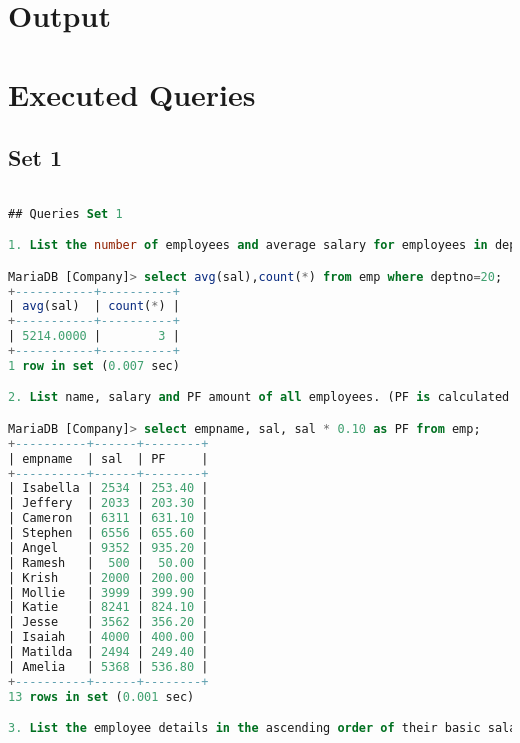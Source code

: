 \documentclass[11pt]{article}
\begin{document}
\section{Output}


\section{Executed Queries}

\subsection{Set 1}
\begin{lstlisting}[language=SQL]

## Queries Set 1

1. List the number of employees and average salary for employees in department 20.

MariaDB [Company]> select avg(sal),count(*) from emp where deptno=20;
+-----------+----------+
| avg(sal)  | count(*) |
+-----------+----------+
| 5214.0000 |        3 |
+-----------+----------+
1 row in set (0.007 sec)

2. List name, salary and PF amount of all employees. (PF is calculated as 10% of basic salary)

MariaDB [Company]> select empname, sal, sal * 0.10 as PF from emp;
+----------+------+--------+
| empname  | sal  | PF     |
+----------+------+--------+
| Isabella | 2534 | 253.40 |
| Jeffery  | 2033 | 203.30 |
| Cameron  | 6311 | 631.10 |
| Stephen  | 6556 | 655.60 |
| Angel    | 9352 | 935.20 |
| Ramesh   |  500 |  50.00 |
| Krish    | 2000 | 200.00 |
| Mollie   | 3999 | 399.90 |
| Katie    | 8241 | 824.10 |
| Jesse    | 3562 | 356.20 |
| Isaiah   | 4000 | 400.00 |
| Matilda  | 2494 | 249.40 |
| Amelia   | 5368 | 536.80 |
+----------+------+--------+
13 rows in set (0.001 sec)

3. List the employee details in the ascending order of their basic salary.


\end{lstlisting}
\end{document}
